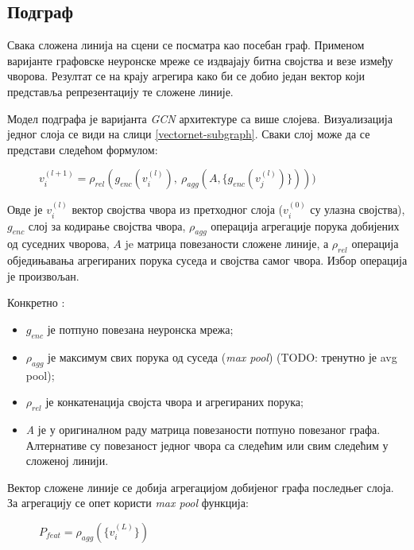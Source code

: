 \documentclass[11pt,oneside]{memoir}
\begin{document}
\subsection{Подграф}

Свака сложена линија на сцени се посматра као посебан граф. Применом варијанте графовске неуронске мреже
се издвајају битна својства и везе између чворова. Резултат се на крају агрегира како би се добио један вектор који представља репрезентацију
те сложене линије.

Модел подграфа је варијанта \textit{GCN} архитектуре \cite{gcn} са више слојева. Визуализација једног слоја се види на слици \ref{vectornet-subgraph}. 
Сваки слој може да се представи следећом формулом:

\begin{figure}[H]
  \centering
  $v^{(l+1)}_{i} = \rho_{rel}(g_{enc}(v^{(l)}_{i}),\ \rho_{agg}(A, \{g_{enc}(v^{(l)}_{j})\})))$
\end{figure}

Овде је $v^{(l)}_{i}$ вектор својства чвора из претходног слоја ($v^{(0)}_{i}$ су улазна својства), $g_{enc}$ слој за кодирање својства чвора, 
$\rho_{agg}$ операција агрегације порука добијених од суседних чворова, $A$ je матрица повезаности сложене линије, 
а $\rho_{rel}$ операција обједињавања агрегираних порука суседа и својства самог чвора. Избор операција је произвољан.

\noindent Конкретно \cite{vectornet}:
\begin{itemize}
  \item $g_{enc}$ је потпуно повезана неуронска мрежа;
  \item $\rho_{agg}$ је максимум свих порука од суседа (\textit{max pool}) (TODO: тренутно је avg pool);
  \item $\rho_{rel}$ је конкатенација својста чвора и агрегираних порука;
  \item \textit{A} је у оригиналном раду матрица повезаности потпуно повезаног графа. Алтернативе су повезаност једног чвора са следећим 
  или свим следећим у сложеној линији. 
\end{itemize}

\noindent Вектор сложене линије се добија агрегацијом добијеног графа последњег слоја. За агрегацију се опет користи \textit{max pool} 
функција:

\begin{figure}[H]
  \centering
  $P_{feat} = \rho_{agg}(\{v^{(L)}_{i}\})$
\end{figure}
\end{document}
